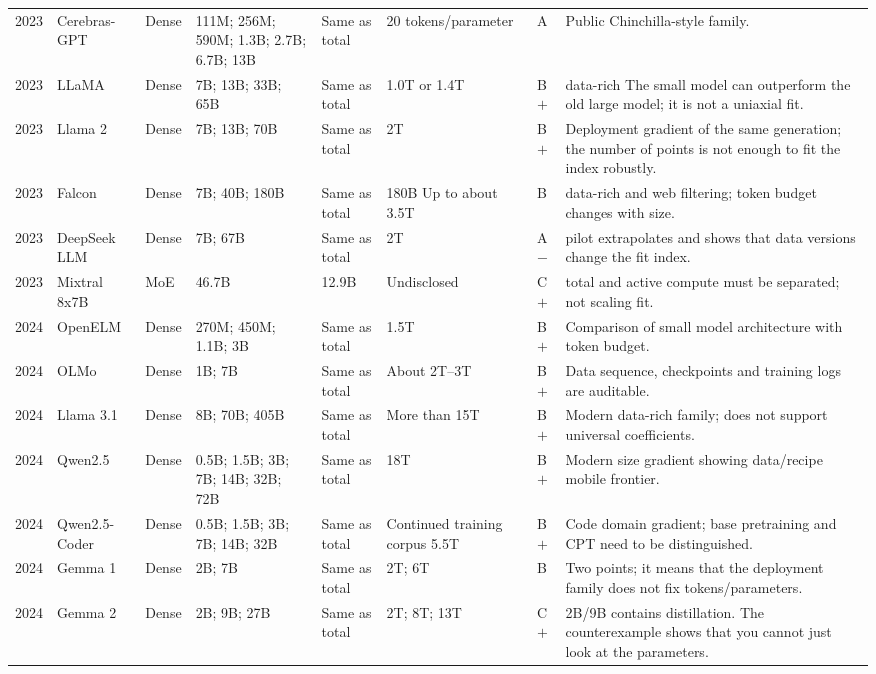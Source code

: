\documentclass[UTF8,10pt,a4paper,fontset=none]{ctexart}
\begin{document}
\begin{longtable}{C{0.55cm}p{1.50cm}p{1.10cm}p{3.20cm}p{2.00cm}p{1.80cm}C{0.65cm}p{3.80cm}}
2023 & Cerebras-GPT\cite{cerebrasgpt2023} & Dense & 111M; 256M; 590M; 1.3B; 2.7B; 6.7B; 13B & Same as total & 20 tokens/parameter & A & Public Chinchilla-style family. \\
2023 & LLaMA\cite{llama2023} & Dense & 7B; 13B; 33B; 65B & Same as total & 1.0T or 1.4T & B$+$ & data-rich The small model can outperform the old large model; it is not a uniaxial fit. \\
2023 & Llama 2\cite{llama2} & Dense & 7B; 13B; 70B & Same as total & 2T & B$+$ & Deployment gradient of the same generation; the number of points is not enough to fit the index robustly. \\
2023 & Falcon\cite{falcon2023} & Dense & 7B; 40B; 180B & Same as total & 180B Up to about 3.5T & B & data-rich and web filtering; token budget changes with size. \\
2023 & DeepSeek LLM\cite{deepseekllm2024} & Dense & 7B; 67B & Same as total & 2T & A$-$ & pilot extrapolates and shows that data versions change the fit index. \\
2023 & Mixtral 8x7B\cite{mixtral2024} & MoE & 46.7B & 12.9B & Undisclosed & C$+$ & total and active compute must be separated; not scaling fit. \\
2024 & Open\allowbreak ELM\cite{openelm2024} & Dense & 270M; 450M; 1.1B; 3B & Same as total & 1.5T & B$+$ & Comparison of small model architecture with token budget. \\
2024 & OLMo\cite{olmo2024} & Dense & 1B; 7B & Same as total & About 2T--3T & B$+$ & Data sequence, checkpoints and training logs are auditable. \\
2024 & Llama 3.1\cite{llama31} & Dense & 8B; 70B; 405B & Same as total & More than 15T & B$+$ & Modern data-rich family; does not support universal coefficients. \\
2024 & Qwen2.5\cite{qwen25} & Dense & 0.5B; 1.5B; 3B; 7B; 14B; 32B; 72B & Same as total & 18T & B$+$ & Modern size gradient showing data/recipe mobile frontier. \\
2024 & Qwen2.5-Coder\cite{qwen25coder} & Dense & 0.5B; 1.5B; 3B; 7B; 14B; 32B & Same as total & Continued training corpus 5.5T & B$+$ & Code domain gradient; base pretraining and CPT need to be distinguished. \\
2024 & Gemma 1\cite{gemma1} & Dense & 2B; 7B & Same as total & 2T; 6T & B & Two points; it means that the deployment family does not fix tokens/parameters. \\
2024 & Gemma 2\cite{gemma2} & Dense & 2B; 9B; 27B & Same as total & 2T; 8T; 13T & C$+$ & 2B/9B contains distillation. The counterexample shows that you cannot just look at the parameters. \\

\end{longtable}
\end{document}
